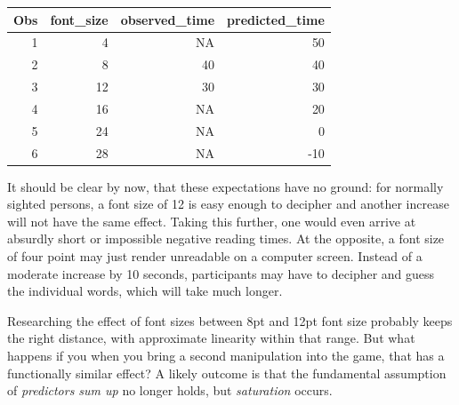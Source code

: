 \documentclass[]{svmono}
\newenvironment{Shaded}{\begin{snugshade}}{\end{snugshade}}
\newcommand{\KeywordTok}[1]{\textcolor[rgb]{0.13,0.29,0.53}{\textbf{#1}}}
\newcommand{\DataTypeTok}[1]{\textcolor[rgb]{0.13,0.29,0.53}{#1}}
\newcommand{\DecValTok}[1]{\textcolor[rgb]{0.00,0.00,0.81}{#1}}
\newcommand{\StringTok}[1]{\textcolor[rgb]{0.31,0.60,0.02}{#1}}
\newcommand{\OtherTok}[1]{\textcolor[rgb]{0.56,0.35,0.01}{#1}}
\newcommand{\OperatorTok}[1]{\textcolor[rgb]{0.81,0.36,0.00}{\textbf{#1}}}
\newcommand{\NormalTok}[1]{#1}
\theoremstyle{definition}
\theoremstyle{definition}
\theoremstyle{definition}
\theoremstyle{remark}
\begin{document}
\begin{Shaded}
\end{Shaded}

\begin{longtable}[]{@{}rrrr@{}}
\toprule
Obs & font\_size & observed\_time & predicted\_time\tabularnewline
\midrule
\endhead
1 & 4 & NA & 50\tabularnewline
2 & 8 & 40 & 40\tabularnewline
3 & 12 & 30 & 30\tabularnewline
4 & 16 & NA & 20\tabularnewline
5 & 24 & NA & 0\tabularnewline
6 & 28 & NA & -10\tabularnewline
\bottomrule
\end{longtable}

It should be clear by now, that these expectations have no ground: for
normally sighted persons, a font size of 12 is easy enough to decipher
and another increase will not have the same effect. Taking this further,
one would even arrive at absurdly short or impossible negative reading
times. At the opposite, a font size of four point may just render
unreadable on a computer screen. Instead of a moderate increase by 10
seconds, participants may have to decipher and guess the individual
words, which will take much longer.

Researching the effect of font sizes between 8pt and 12pt font size
probably keeps the right distance, with approximate linearity within
that range. But what happens if you when you bring a second manipulation
into the game, that has a functionally similar effect? A likely outcome
is that the fundamental assumption of \emph{predictors sum up} no longer
holds, but \emph{saturation} occurs.
\end{document}
